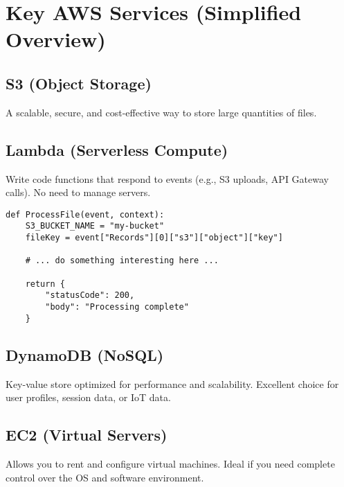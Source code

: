 \documentclass[11pt]{article}
\begin{document}
\clearpage

\section{Key AWS Services (Simplified Overview)}

\subsection{S3 (Object Storage)}
A scalable, secure, and cost-effective way to store large quantities of files.
\begin{center}
\end{center}

\subsection{Lambda (Serverless Compute)}
Write code functions that respond to events (e.g., S3 uploads, API Gateway calls). No need to manage servers.

\begin{verbatim}
def ProcessFile(event, context):
    S3_BUCKET_NAME = "my-bucket"
    fileKey = event["Records"][0]["s3"]["object"]["key"]

    # ... do something interesting here ...

    return {
        "statusCode": 200,
        "body": "Processing complete"
    }
\end{verbatim}

\subsection{DynamoDB (NoSQL)}
Key-value store optimized for performance and scalability. Excellent choice for user profiles, session data, or IoT data.

\subsection{EC2 (Virtual Servers)}
Allows you to rent and configure virtual machines. Ideal if you need complete control over the OS and software environment.
\end{document}
